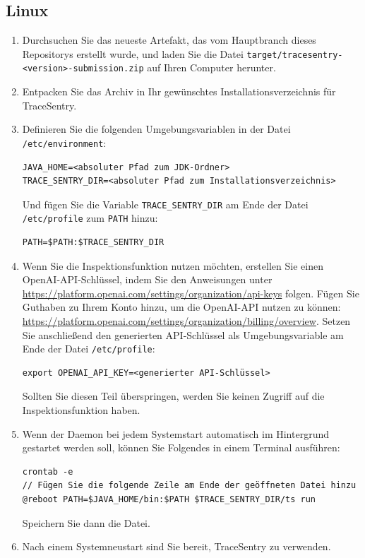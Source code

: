 \documentclass[a4paper,12pt]{report}
\begin{document}
    \subsection{Linux}\label{subsec:linux}
    \begin{enumerate}
        \item Durchsuchen Sie das neueste Artefakt, das vom Hauptbranch dieses Repositorys erstellt wurde, und laden Sie die Datei
        \texttt{target/tracesentry-\textless{}version\textgreater{}-submission.zip} auf Ihren Computer herunter.
        \item Entpacken Sie das Archiv in Ihr gewünschtes Installationsverzeichnis für TraceSentry.
        \item Definieren Sie die folgenden Umgebungsvariablen in der Datei \texttt{/etc/environment}:
        \begin{lstlisting}[label={lst:lstlisting-unix-1}]
JAVA_HOME=<absoluter Pfad zum JDK-Ordner>
TRACE_SENTRY_DIR=<absoluter Pfad zum Installationsverzeichnis>
        \end{lstlisting}
        Und fügen Sie die Variable \texttt{TRACE\_SENTRY\_DIR} am Ende der Datei \texttt{/etc/profile} zum \texttt{PATH} hinzu:
        \begin{lstlisting}[label={lst:lstlisting-unix-2}]
PATH=$PATH:$TRACE_SENTRY_DIR
        \end{lstlisting}
        \item Wenn Sie die Inspektionsfunktion nutzen möchten, erstellen Sie einen OpenAI-API-Schlüssel, indem Sie den Anweisungen unter \url{https://platform.openai.com/settings/organization/api-keys} folgen.
        Fügen Sie Guthaben zu Ihrem Konto hinzu, um die OpenAI-API nutzen zu können: \url{https://platform.openai.com/settings/organization/billing/overview}.
        Setzen Sie anschließend den generierten API-Schlüssel als Umgebungsvariable am Ende der Datei \texttt{/etc/profile}:
        \begin{lstlisting}[label={lst:lstlisting-unix-3}]
export OPENAI_API_KEY=<generierter API-Schlüssel>
        \end{lstlisting}
        Sollten Sie diesen Teil überspringen, werden Sie keinen Zugriff auf die Inspektionsfunktion haben.
        \item Wenn der Daemon bei jedem Systemstart automatisch im Hintergrund gestartet werden soll, können Sie Folgendes in einem Terminal ausführen:
        \begin{lstlisting}[label={lst:lstlisting-unix-4}]
crontab -e
// Fügen Sie die folgende Zeile am Ende der geöffneten Datei hinzu
@reboot PATH=$JAVA_HOME/bin:$PATH $TRACE_SENTRY_DIR/ts run
        \end{lstlisting}
        Speichern Sie dann die Datei.
        \item Nach einem Systemneustart sind Sie bereit, TraceSentry zu verwenden.
    \end{enumerate}
\end{document}
